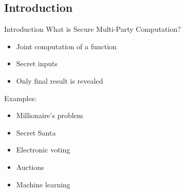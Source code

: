 \begin{frame}
\section{Introduction}
\end{frame}

\begin{frame}{Introduction}
\protect\hypertarget{introduction}{}
What is Secure Multi-Party Computation?

\begin{itemize}
\tightlist
\item
  Joint computation of a function
\item
  Secret inputs
\item
  Only final result is revealed
\end{itemize}

Examples:

\begin{itemize}
\tightlist
\item
  Millionaire's problem
\item
  Secret Santa
\item
  Electronic voting
\item
  Auctions
\item
  Machine learning
\end{itemize}
\end{frame}


